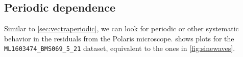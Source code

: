 \documentclass{article}
\begin{document}
\subsection{Periodic dependence}
\label{sec:BMSperiodic}

Similar to \cref{sec:vectraperiodic}, we can look for periodic or other systematic behavior in the residuals from the Polaris microscope.   shows plots for the \texttt{ML1603474\_BMS069\_5\_21} dataset, equivalent to the ones in \cref{fig:sinewaves}.


\end{document}
